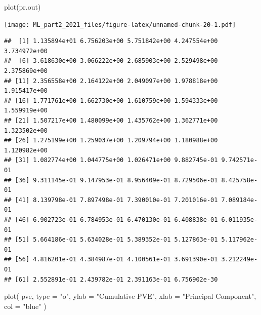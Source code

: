 \documentclass[
]{article}
\newenvironment{Shaded}{\begin{snugshade}}{\end{snugshade}}
\newcommand{\AttributeTok}[1]{\textcolor[rgb]{0.77,0.63,0.00}{#1}}
\newcommand{\DecValTok}[1]{\textcolor[rgb]{0.00,0.00,0.81}{#1}}
\newcommand{\FunctionTok}[1]{\textcolor[rgb]{0.00,0.00,0.00}{#1}}
\newcommand{\NormalTok}[1]{#1}
\newcommand{\OtherTok}[1]{\textcolor[rgb]{0.56,0.35,0.01}{#1}}
\newcommand{\SpecialCharTok}[1]{\textcolor[rgb]{0.00,0.00,0.00}{#1}}
\newcommand{\StringTok}[1]{\textcolor[rgb]{0.31,0.60,0.02}{#1}}
\begin{document}
\begin{Shaded}
\begin{Highlighting}[]
\FunctionTok{plot}\NormalTok{(pr.out)}
\end{Highlighting}
\end{Shaded}

\texttt{[image: ML\_part2\_2021\_files/figure-latex/unnamed-chunk-20-1.pdf]}

\begin{Shaded}
\end{Shaded}

\begin{verbatim}
##  [1] 1.135894e+01 6.756203e+00 5.751842e+00 4.247554e+00 3.734972e+00
##  [6] 3.618630e+00 3.066222e+00 2.685903e+00 2.529498e+00 2.375869e+00
## [11] 2.356558e+00 2.164122e+00 2.049097e+00 1.978818e+00 1.915417e+00
## [16] 1.771761e+00 1.662730e+00 1.610759e+00 1.594333e+00 1.559919e+00
## [21] 1.507217e+00 1.480099e+00 1.435762e+00 1.362771e+00 1.323502e+00
## [26] 1.275199e+00 1.259037e+00 1.209794e+00 1.180988e+00 1.120982e+00
## [31] 1.082774e+00 1.044775e+00 1.026471e+00 9.882745e-01 9.742571e-01
## [36] 9.311145e-01 9.147953e-01 8.956409e-01 8.729506e-01 8.425758e-01
## [41] 8.139798e-01 7.897498e-01 7.390010e-01 7.201016e-01 7.089184e-01
## [46] 6.902723e-01 6.784953e-01 6.470130e-01 6.408838e-01 6.011935e-01
## [51] 5.664186e-01 5.634028e-01 5.389352e-01 5.127863e-01 5.117962e-01
## [56] 4.816201e-01 4.384987e-01 4.100561e-01 3.691390e-01 3.212249e-01
## [61] 2.552891e-01 2.439782e-01 2.391163e-01 6.756902e-30
\end{verbatim}

\begin{Shaded}
\begin{Highlighting}[]
\FunctionTok{plot}\NormalTok{(}
\NormalTok{  pve,}
  \AttributeTok{type =} \StringTok{"o"}\NormalTok{,}
  \AttributeTok{ylab =} \StringTok{"Cumulative PVE"}\NormalTok{,}
  \AttributeTok{xlab =} \StringTok{"Principal Component"}\NormalTok{,}
  \AttributeTok{col =} \StringTok{"blue"}
\NormalTok{)}
\end{Highlighting}
\end{Shaded}
\end{document}
